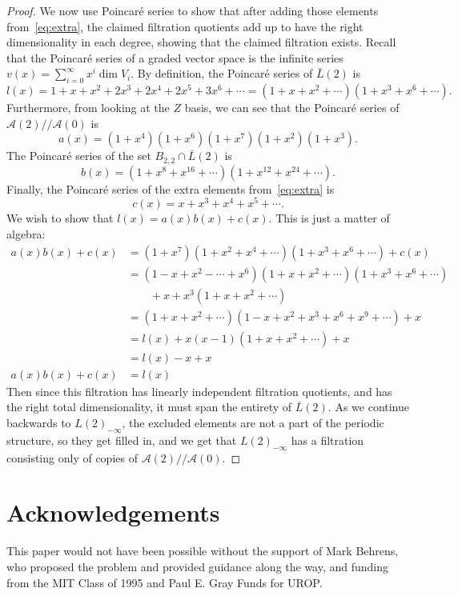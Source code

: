 \documentclass{article}
\newcommand{\A}{\mathcal{A}}
\newcommand{\mmod}{/\!/\!}
\renewcommand{\L}{\bar{L}}
\newcommand{\Lkm}[1][k]{L{(#1)}_{-\infty}}
\begin{document}
\begin{proof}
  We now use Poincar\'e series to show that after adding those elements from~\eqref{eq:extra}, the claimed filtration quotients add up to have the right dimensionality in each degree, showing that the claimed filtration exists.  Recall that the Poincar\'e series of a graded vector space is the infinite series $v(x) = \sum_{i=0}^{\infty} x^i \dim V_i$.  By definition, the Poincar\'e series of $\L(2)$ is
  \[ l(x) = 1 + x + x^2 + 2x^3 + 2x^4 + 2x^5 + 3x^6 + \cdots = (1 + x + x^2 + \cdots)(1 + x^3 + x^6 + \cdots).\]
  Furthermore, from looking at the $Z$ basis, we can see that the Poincar\'e series of $\A(2)\mmod\A(0)$ is
  \[ a(x) = (1+x^4)(1+x^6)(1+x^7)(1+x^2)(1+x^3).\]
  The Poincar\'e series of the set $B_{2,2}\cap \L(2)$ is
  \[ b(x) = (1 + x^8 + x^{16} + \cdots)(1 + x^{12} + x^{24} + \cdots).\]
  Finally, the Poincar\'e series of the extra elements from~\eqref{eq:extra} is
  \[ c(x) = x + x^3 + x^4 + x^5 + \cdots.\]
  We wish to show that $l(x) = a(x)b(x) + c(x)$.  This is just a matter of algebra:
  \begin{align*}
    a(x)b(x) + c(x) &= (1+x^7)(1 + x^2 + x^4 + \cdots)(1 + x^3 + x^6 + \cdots) + c(x) \\
                    &= (1-x+x^2-\cdots+x^6)(1 + x + x^2 + \cdots)(1 + x^3 + x^6 + \cdots) \\
                    &\qquad + x + x^3(1 + x + x^2 + \cdots) \\
                    &= (1 + x + x^2 + \cdots)(1 - x + x^2 + x^3 + x^6 + x^9 + \cdots) + x \\
                    &= l(x) + x(x-1)(1 + x + x^2 + \cdots) + x \\
                    &= l(x) - x + x \\
    a(x)b(x) + c(x) &= l(x)
  \end{align*}
  Then since this filtration has linearly independent filtration quotients, and has the right total dimensionality, it must span the entirety of $\L(2)$.  As we continue backwards to $\Lkm[2]$, the excluded elements are not a part of the periodic structure, so they get filled in, and we get that $\Lkm[2]$ has a filtration consisting only of copies of $\A(2)\mmod\A(0)$.
\end{proof}

\section{Acknowledgements}

This paper would not have been possible without the support of Mark Behrens, who proposed the problem and provided guidance along the way, and funding from the MIT Class of 1995 and Paul E. Gray Funds for UROP.

\printbibliography
\end{document}
